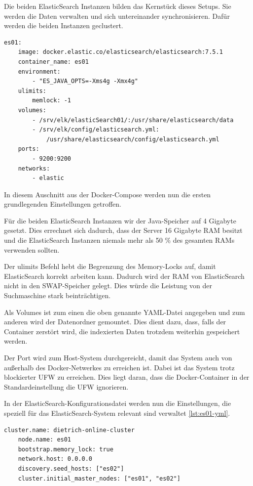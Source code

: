 Die beiden ElasticSearch Instanzen bilden das Kernstück dieses Setups. Sie werden die Daten verwalten und sich untereinander synchronisieren. Dafür werden die beiden Instanzen geclustert.

\begin{lstlisting}[language=XML, frame=single, label={lst:es01}] 
	es01:
	image: docker.elastic.co/elasticsearch/elasticsearch:7.5.1
	container_name: es01
	environment:
		- "ES_JAVA_OPTS=-Xms4g -Xmx4g"
	ulimits:
		memlock: -1
	volumes:
		- /srv/elk/elasticSearch01/:/usr/share/elasticsearch/data
		- /srv/elk/config/elasticsearch.yml:
			/usr/share/elasticsearch/config/elasticsearch.yml
	ports:
		- 9200:9200
	networks:
		- elastic
\end{lstlisting}

In diesem Auschnitt aus der Docker-Compose werden nun die ersten grundlegenden Einstellungen getroffen.

Für die beiden ElasticSearch Instanzen wir der Java-Speicher auf 4 Gigabyte gesetzt. Dies errechnet sich dadurch, dass der Server 16 Gigabyte RAM besitzt und die ElasticSearch Instanzen niemals mehr als 50 \% des gesamten RAMs verwenden sollten. \cite{ElasticsearchB.V..12172019}

Der ulimits Befehl hebt die Begrenzung des Memory-Locks auf, damit ElasticSearch korrekt arbeiten kann. Dadurch wird der RAM von ElasticSearch nicht in den SWAP-Speicher gelegt. Dies würde die Leistung von der Suchmaschine stark beinträchtigen.

Als Volumes ist zum einen die oben genannte YAML-Datei angegeben und zum anderen wird der Datenordner gemountet. Dies dient dazu, dass, falls der Container zerstört wird, die indexierten Daten trotzdem weiterhin gespeichert werden.

Der Port wird zum Host-System durchgereicht, damit das System auch von außerhalb des Docker-Netwerkes zu erreichen ist. Dabei ist das System trotz blockierter UFW zu erreichen. Dies liegt daran, dass die Docker-Container in der Standardeinstellung die UFW ignorieren.

In der ElasticSearch-Konfigurationsdatei werden nun die Einstellungen, die speziell für das ElasticSearch-System relevant sind verwaltet \ref{lst:es01-yml}. 

\begin{lstlisting}[language=XML, frame=single, label={lst:es01-yml}] 
	cluster.name: dietrich-online-cluster
	node.name: es01
	bootstrap.memory_lock: true
	network.host: 0.0.0.0
	discovery.seed_hosts: ["es02"]
	cluster.initial_master_nodes: ["es01", "es02"]
\end{lstlisting}

